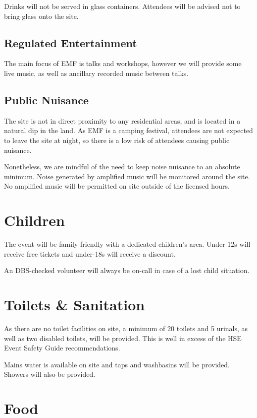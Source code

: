 Drinks will not be served in glass containers. Attendees will be advised not to bring
glass onto the site.

\subsection{Regulated Entertainment}

The main focus of EMF is talks and workshops, however we will provide some live music,
as well as ancillary recorded music between talks.

\subsection{Public Nuisance}

The site is not in direct proximity to any residential areas, and is located in a
natural dip in the land. As EMF is a camping festival, attendees are not expected to leave the site
at night, so there is a low risk of attendees causing public nuisance.

Nonetheless, we are mindful of the need to keep noise nuisance
to an absolute minimum. Noise generated by amplified music will be monitored around the site.
No amplified music will be permitted on site outside of the licensed hours.

\section{Children}

The event will be family-friendly with a dedicated children's area. Under-12s will receive free tickets
and under-18s will receive a discount.

An DBS-checked volunteer will always be on-call in case of a lost child situation.

\section{Toilets \& Sanitation}

As there are no toilet facilities on site, a minimum of 20 toilets and 5 urinals, as well as two disabled toilets,
will be provided. This is well in excess of the HSE Event Safety Guide recommendations.

Mains water is available on site and taps and washbasins will be provided. Showers will also be provided.

\section{Food}

